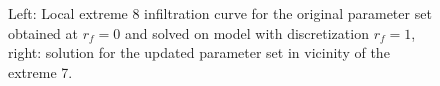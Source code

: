 \documentclass[review,times,3p,10pt]{elsarticle}
\begin{document}
\begin{figure}
\label{rf0rf1img2}
\caption{Left: Local extreme 8 infiltration curve for the original parameter set obtained at $r_f=0$ and solved on model with discretization $r_f=1$, right: solution for the updated parameter set in  vicinity of the extreme 7.}
\end{figure}
\end{document}
